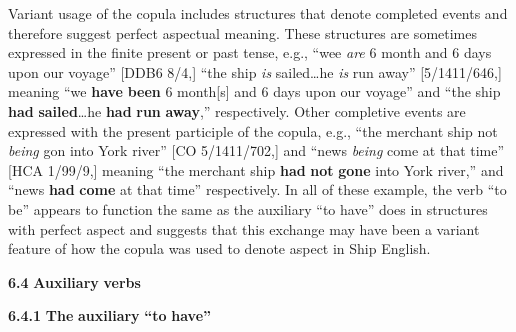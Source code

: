   Variant usage of the copula includes structures that denote completed events and therefore suggest perfect aspectual meaning. These structures are sometimes expressed in the finite present or past tense, e.g., “wee \textit{are} 6 month and 6 days upon our voyage” [DDB6 8/4,] “the ship \textit{is} sailed…he \textit{is} run away” [5/1411/646,] meaning “we \textbf{have} \textbf{been} 6 month[s] and 6 days upon our voyage” and “the ship \textbf{had }\textbf{sailed}…he \textbf{had} \textbf{run} \textbf{away},” respectively. Other completive events are expressed with the present participle of the copula, e.g., “the merchant ship not \textit{being} gon into York river” [CO 5/1411/702,] and “news \textit{being} come at that time” [HCA 1/99/9,] meaning “the merchant ship \textbf{had} \textbf{not} \textbf{gone} into York river,” and “news \textbf{had} \textbf{come} at that time” respectively. In all of these example, the verb “to be” appears to function the same as the auxiliary “to have” does in structures with perfect aspect and suggests that this exchange may have been a variant feature of how the copula was used to denote aspect in Ship English. 

\textbf{6.4} \textbf{Auxiliary} \textbf{verbs}

  \textbf{6.4.1} \textbf{The} \textbf{auxiliary} \textbf{“to} \textbf{have”}

